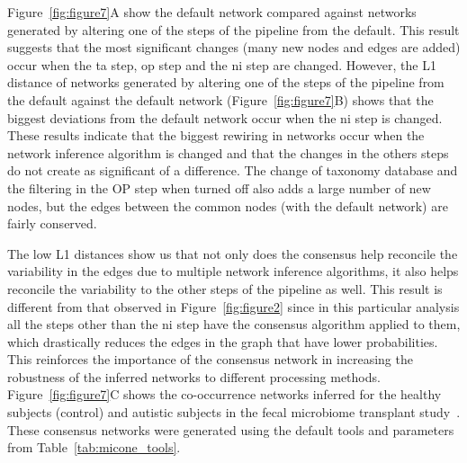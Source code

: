   Figure~\ref{fig:figure7}A show the default network compared against networks generated by altering one of the steps of the pipeline from the default.
  This result suggests that the most significant changes (many new nodes and edges are added) occur when the \ac{ta} step, \ac{op} step and the \ac{ni} step are changed.
  However, the L1 distance of networks generated by altering one of the steps of the pipeline from the default against the default network (Figure~\ref{fig:figure7}B) shows that the biggest deviations from the default network occur when the \ac{ni} step is changed.
  These results indicate that the biggest rewiring in networks occur when the network inference algorithm is changed and that the changes in the others steps do not create as significant of a difference.
  The change of taxonomy database and the filtering in the \ac{OP} step when turned off also adds a large number of new nodes, but the edges between the common nodes (with the default network) are fairly conserved.

  The low L1 distances show us that not only does the consensus help reconcile the variability in the edges due to multiple network inference algorithms, it also helps reconcile the variability to the other steps of the pipeline as well.
  This result is different from that observed in Figure~\ref{fig:figure2} since in this particular analysis all the steps other than the \ac{ni} step have the consensus algorithm applied to them, which drastically reduces the edges in the graph that have lower probabilities.
  This reinforces the importance of the consensus network in increasing the robustness of the inferred networks to different processing methods.
  Figure~\ref{fig:figure7}C shows the co-occurrence networks inferred for the healthy subjects (control) and autistic subjects in the fecal microbiome transplant study~\cite{Kang2017}.
  These consensus networks were generated using the default tools and parameters from Table~\ref{tab:micone_tools}.
